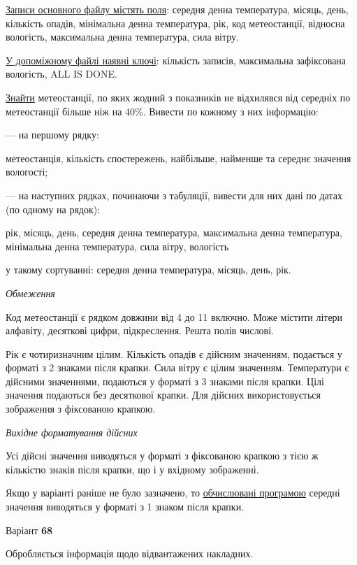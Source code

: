 \documentclass[11pt, ukrainian]{article}
\begin{document}
\underline{Записи основного файлу містять поля}: середня денна температура, місяць, день, кількість опадів, мінімальна денна температура, рік, код метеостанції, відносна вологість, максимальна денна температура, сила вітру.

\underline{У допоміжному файлі наявні ключі}: кількість записів, максимальна зафіксована вологість, ALL IS DONE.

\underline{Знайти} метеостанції, по яких жодний з показників не відхилявся від середніх по метеостанції більше ніж на 40\%. Вивести по кожному з них інформацію:\par
{\noindent}--- на першому рядку:\par
метеостанція, кількість спостережень, найбільше, найменше та середнє значення вологості;

{\noindent}--- на наступних рядках, починаючи з табуляції, вивести для них дані по датах (по одному на рядок):\par
рік, місяць, день, середня денна температура, максимальна денна температура, мінімальна денна температура, сила вітру, вологість

{\noindent}у такому сортуванні: середня денна температура, місяць, день, рік.


\bigskip\textit{Обмеження}

Код метеостанції є рядком довжини від 4 до 11 включно.
Може містити літери алфавіту, десяткові цифри, підкреслення. Решта полів числові.

Рік є чотиризначним цілим.
Кількість опадів є дійсним значенням, подається у форматі з 2 знаками після крапки.
Сила вітру є цілим значенням.
Температури є дійсними значеннями, подаються у форматі з 3 знаками після крапки.
Цілі значення подаються без десяткової крапки.
Для дійсних використовується зображення з фіксованою крапкою.

\textit{Вихідне форматування дійсних}

Усі дійсні значення виводяться у форматі з фіксованою крапкою з тією ж кількістю знаків після крапки, що і у вхідному зображенні.

Якщо у варіанті раніше не було зазначено, то \underline{обчислювані програмою} середні значення виводяться у форматі з 1 знаком після крапки.




\par
\newpage
{\center Варіант  \No \textbf { 68 }\par}
\bigskip
Обробляється інформація щодо відвантажених накладних.
\end{document}
